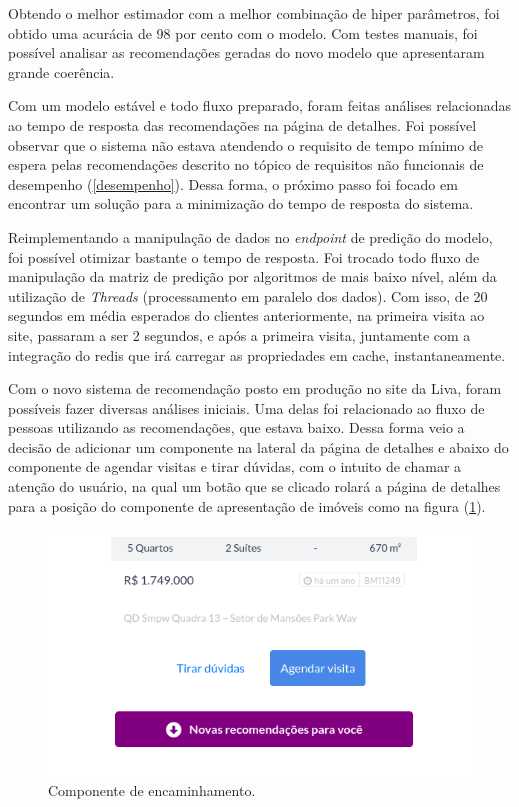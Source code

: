 Obtendo o melhor estimador com a melhor combinação de hiper parâmetros, foi obtido uma acurácia de 98 por cento com o modelo. Com testes manuais, foi possível analisar as recomendações geradas do novo modelo que apresentaram grande coerência.

Com um modelo estável e todo fluxo preparado, foram feitas análises relacionadas ao tempo de resposta das recomendações na página de detalhes. Foi possível observar que o sistema não estava atendendo o requisito de tempo mínimo de espera pelas recomendações descrito no tópico de requisitos não funcionais de desempenho (\ref{desempenho}). Dessa forma, o próximo passo foi focado em encontrar um solução para a minimização do tempo de resposta do sistema.

Reimplementando a manipulação de dados no \textit{endpoint} de predição do modelo, foi possível otimizar bastante o tempo de resposta. Foi trocado todo fluxo de manipulação da matriz de predição por algoritmos de mais baixo nível, além da utilização de \textit{Threads} (processamento em paralelo dos dados). Com isso, de 20 segundos em média esperados do clientes anteriormente, na primeira visita ao site, passaram a ser 2 segundos, e após a primeira visita, juntamente com a integração do redis que irá carregar as propriedades em cache, instantaneamente.

Com o novo sistema de recomendação posto em produção no site da Liva, foram possíveis fazer diversas análises iniciais. Uma delas foi relacionado ao fluxo de pessoas utilizando as recomendações, que estava baixo. Dessa forma veio a decisão de adicionar um componente na lateral da página de detalhes e abaixo do componente de agendar visitas e tirar dúvidas, com o intuito de chamar a atenção do usuário, na qual um botão que se clicado rolará a página de detalhes para a posição do componente de apresentação de imóveis como na figura (\ref{fig:componente_scroll}).

\begin{figure}[H]
    \centering
    \includegraphics[scale=0.6]{figuras/desenvolvimento/componente_scroll.png}
    \caption[Componente de encaminhamento]{Componente de encaminhamento.}
    \label{fig:componente_scroll}
\end{figure}

